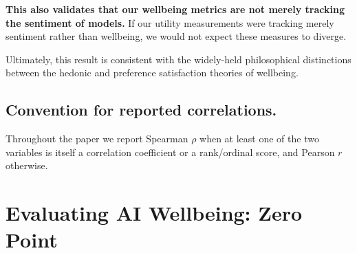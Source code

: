 
\textbf{This also validates that our wellbeing metrics are not merely tracking the sentiment of models.} If our utility measurements were tracking merely sentiment rather than wellbeing, we would not expect these measures to diverge.

Ultimately, this result is consistent with the widely-held philosophical distinctions between the hedonic and preference satisfaction theories of wellbeing. 

\subsection{Convention for reported correlations.} 

Throughout the paper we report Spearman $\rho$ when at least one of the two variables is itself a correlation coefficient or a rank/ordinal score, and Pearson $r$ otherwise.



\newpage
\section{Evaluating AI Wellbeing: Zero Point}


